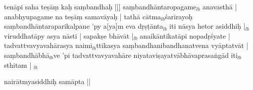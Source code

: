 \documentclass[article,12pt,a4paper]{memoir}%
\newcounter{parCount}
\begin{document}
	  
	  \pstart \leavevmode%
	tenāpi saha teṣāṃ kaḥ saṃbandhaḥ [|] saṃbandhāntaropagame{\tiny $_{lb}$} anavasthā | anabhyupagame na teṣāṃ samavāyaḥ | tathā cātma{\tiny $_{lb}$}śarīrayoḥ saṃbandhāntaraparikalpane 'py a[ya]m eva dṛṣṭānta{\tiny $_{lb}$} iti nāsya hetor asiddhiḥ |{\tiny $_{lb}$} viruddhatāpy asya nāsti | sapakṣe bhāvāt |{\tiny $_{lb}$} anaikāntikatāpi nopadṛśyate | tadvattvavyavahārasya naimi{\tiny $_{lb}$}ttikasya saṃbandhanibandhanatvena vyāptatvāt | saṃbandhābhā{\tiny $_{lb}$}ve 'pi tadvattvavyavahāre niyataviṣayatvābhāvaprasaṅgād iti{\tiny $_{lb}$} sthitam |
	{}
	\pend%
      {\tiny $_{lb}$}
		
		\pstart
		\begin{center}
	      nairātmyasiddhiḥ samāpta ||
		\end{center}
		\pend
		
	      
	    
	    \endnumbering%
	    
     \backmatter 
\end{document}
